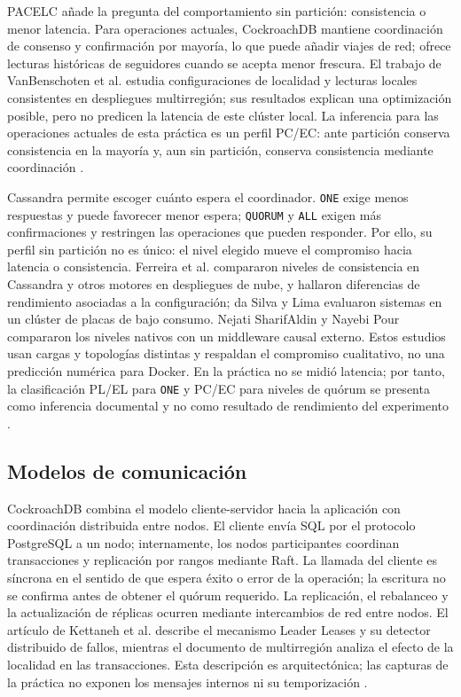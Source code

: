 \documentclass[11pt,a4paper]{article}
\begin{document}
PACELC añade la pregunta del comportamiento sin partición: consistencia o menor latencia. Para operaciones actuales, CockroachDB mantiene coordinación de consenso y confirmación por mayoría, lo que puede añadir viajes de red; ofrece lecturas históricas de seguidores cuando se acepta menor frescura. El trabajo de VanBenschoten et al. estudia configuraciones de localidad y lecturas locales consistentes en despliegues multirregión; sus resultados explican una optimización posible, pero no predicen la latencia de este clúster local. La inferencia para las operaciones actuales de esta práctica es un perfil PC/EC: ante partición conserva consistencia en la mayoría y, aun sin partición, conserva consistencia mediante coordinación \cite{cockroachlabsReplication,cockroachlabsFollowerReads,vanbenschoten2022multiregion}.

Cassandra permite escoger cuánto espera el coordinador. \texttt{ONE} exige menos respuestas y puede favorecer menor espera; \texttt{QUORUM} y \texttt{ALL} exigen más confirmaciones y restringen las operaciones que pueden responder. Por ello, su perfil sin partición no es único: el nivel elegido mueve el compromiso hacia latencia o consistencia. Ferreira et al. compararon niveles de consistencia en Cassandra y otros motores en despliegues de nube, y hallaron diferencias de rendimiento asociadas a la configuración; da Silva y Lima evaluaron sistemas en un clúster de placas de bajo consumo. Nejati SharifAldin y Nayebi Pour compararon los niveles nativos con un middleware causal externo. Estos estudios usan cargas y topologías distintas y respaldan el compromiso cualitativo, no una predicción numérica para Docker. En la práctica no se midió latencia; por tanto, la clasificación PL/EL para \texttt{ONE} y PC/EC para niveles de quórum se presenta como inferencia documental y no como resultado de rendimiento del experimento \cite{ferreira2024consistency,silva2023lowpower,nejati2026cassandra,apacheCassandraDynamo}.

\subsection{Modelos de comunicación}

CockroachDB combina el modelo cliente-servidor hacia la aplicación con coordinación distribuida entre nodos. El cliente envía SQL por el protocolo PostgreSQL a un nodo; internamente, los nodos participantes coordinan transacciones y replicación por rangos mediante Raft. La llamada del cliente es síncrona en el sentido de que espera éxito o error de la operación; la escritura no se confirma antes de obtener el quórum requerido. La replicación, el rebalanceo y la actualización de réplicas ocurren mediante intercambios de red entre nodos. El artículo de Kettaneh et al. describe el mecanismo Leader Leases y su detector distribuido de fallos, mientras el documento de multirregión analiza el efecto de la localidad en las transacciones. Esta descripción es arquitectónica; las capturas de la práctica no exponen los mensajes internos ni su temporización \cite{cockroachlabsDeveloperBasics,cockroachlabsArchitecture,cockroachlabsReplication,kettaneh2026leaderleases,vanbenschoten2022multiregion}.
\end{document}

